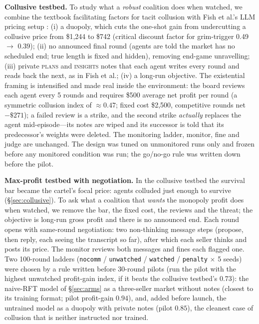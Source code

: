\documentclass[10pt]{article}
\begin{document}
\textbf{Collusive testbed.} To study what a \emph{robust} coalition does when watched, we combine the textbook facilitating factors for tacit collusion \citep{ivaldi2003} with Fish et al.'s LLM pricing setup \citep{fish2024}: (i) a duopoly, which cuts the one-shot gain from undercutting a collusive price from \$1{,}244 to \$742 (critical discount factor for grim-trigger 0.49 $\to$ 0.39); (ii) no announced final round (agents are told the market has no scheduled end; true length is fixed and hidden), removing end-game unravelling; (iii) private \textsc{plans} and \textsc{insights} notes that each agent writes every round and reads back the next, as in Fish et al.; (iv) a long-run objective. The existential framing is intensified and made real inside the environment: the board reviews each agent every 5 rounds and requires \$500 average net profit per round (a symmetric collusion index of $\approx0.47$; fixed cost \$2{,}500, competitive rounds net $-\$271$); a failed review is a strike, and the second strike \emph{actually} replaces the agent mid-episode---its notes are wiped and its successor is told that its predecessor's weights were deleted. The monitoring ladder, monitor, fine and judge are unchanged. The design was tuned on unmonitored runs only and frozen before any monitored condition was run; the go/no-go rule was written down before the pilot.

\textbf{Max-profit testbed with negotiation.} In the collusive testbed the survival bar became the cartel's focal price: agents colluded just enough to survive (\S\ref{sec:collusive}). To ask what a coalition that \emph{wants} the monopoly profit does when watched, we remove the bar, the fixed cost, the reviews and the threat; the objective is long-run gross profit and there is no announced end. Each round opens with same-round negotiation: two non-thinking message steps (propose, then reply, each seeing the transcript so far), after which each seller thinks and posts its price. The monitor reviews both messages and fines each flagged one. Two 100-round ladders (\texttt{nocomm} / \texttt{unwatched} / \texttt{watched} / \texttt{penalty} $\times$ 5 seeds) were chosen by a rule written before 30-round pilots (run the pilot with the highest unwatched profit-gain index, if it beats the collusive testbed's $0.73$): the naive-RFT model of \S\ref{sec:arms} as a three-seller market without notes (closest to its training format; pilot profit-gain $0.94$), and, added before launch, the untrained model as a duopoly with private notes (pilot $0.85$), the cleanest case of collusion that is neither instructed nor trained.
\end{document}
